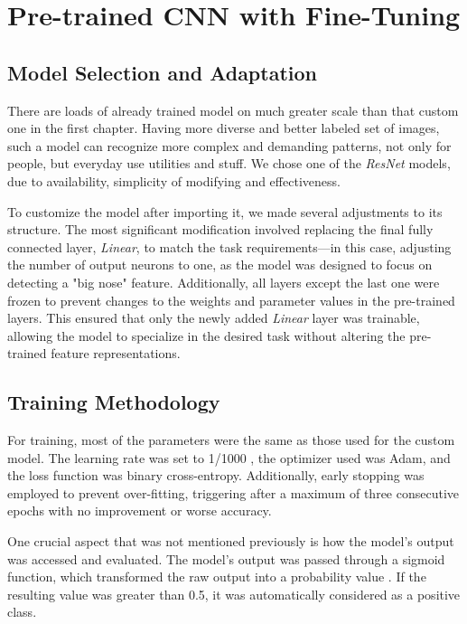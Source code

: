 \documentclass{article}
\begin{document}
\vspace{0.2cm}
\section{Pre-trained CNN with  Fine-Tuning}

\subsection{Model Selection and Adaptation}
    There are loads of already trained model on much greater scale than that custom one in the first chapter. Having more diverse and better labeled set of images, such a model can recognize more complex and demanding patterns, not only for people, but everyday use utilities and stuff. We chose one of the {\textit{ResNet}} models, due to availability, simplicity of modifying and effectiveness.

    To customize the model after importing it, we made several adjustments to its structure. The most significant modification involved replacing the final fully connected layer, \textit{Linear}, to match the task requirements—in this case, adjusting the number of output neurons to one, as the model was designed to focus on detecting a "big nose" feature. Additionally, all layers except the last one were frozen to prevent changes to the weights and parameter values in the pre-trained layers. This ensured that only the newly added \textit{Linear} layer was trainable, allowing the model to specialize in the desired task without altering the pre-trained feature representations.

\subsection{Training Methodology}

For training, most of the parameters were the same as those used for the custom model. The learning rate was set to 1/1000
 , the optimizer used was Adam, and the loss function was binary cross-entropy. Additionally, early stopping was employed to prevent over-fitting, triggering after a maximum of three consecutive epochs with no improvement or worse accuracy.

One crucial aspect that was not mentioned previously is how the model's output was accessed and evaluated. The model's output was passed through a sigmoid function, which transformed the raw output into a probability value . If the resulting value was greater than 0.5, it was automatically considered as a positive class.
\end{document}
